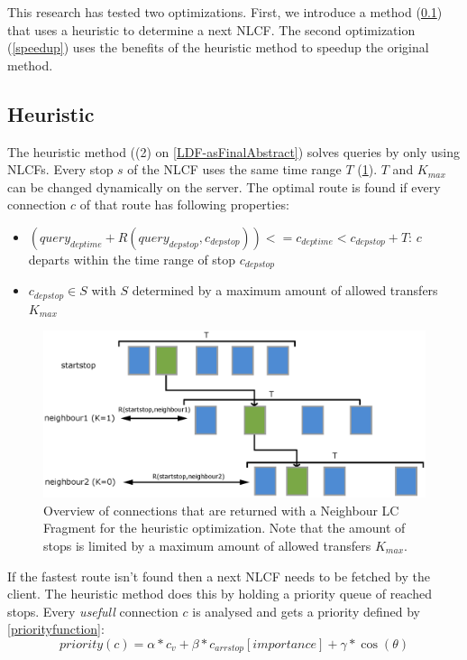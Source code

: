 \documentclass[twocolumn]{phdsymp} %
\begin{document}
This research has tested two optimizations. First, we introduce a method (\cref{heuristic}) that uses a heuristic to determine a next NLCF.  The second optimization (\cref{speedup}) uses the benefits of the heuristic method to speedup the original method.

\subsection{Heuristic}
\label{heuristic}

The heuristic method ((2) on \cref{LDF-asFinalAbstract}) solves queries by only using NLCFs. Every stop $s$ of the NLCF uses the same time range $T$ (\cref{neighbourconnections}). 
$T$ and $K_{max}$ can be changed dynamically on the server.
The optimal route is found if every connection $c$ of that route has following properties:
\begin{itemize}
\item $ ( query_{deptime} + R(query_{depstop}, c_{depstop}) ) <= c_{deptime} < c_{depstop} + T$: $c$ departs within the time range of stop $c_{depstop}$
\item $c_{depstop} \in S$ with $S$ determined by a maximum amount of allowed transfers $K_{max}$
\end{itemize}

\begin{figure}[ht]
\begin{center}
	\includegraphics[width=.50\textwidth]{Burenconnecties}
	\caption{\label{neighbourconnections}Overview of connections that are returned with a Neighbour LC Fragment for the heuristic optimization. Note that the amount of stops is limited by a maximum amount of allowed transfers $K_{max}$.}
\end{center}
\end{figure}

If the fastest route isn't found then a next NLCF needs to be fetched by the client. The heuristic method does this by holding a priority queue of reached stops. Every \textit{usefull} connection $c$ is analysed and gets a priority defined by \cref{priorityfunction}:
\begin{equation} \label{priorityfunction}
priority(c) = \alpha * c_{v} + \beta * c_{arrstop}[importance] + \gamma * \cos(\theta)
\end{equation}
\end{document}
